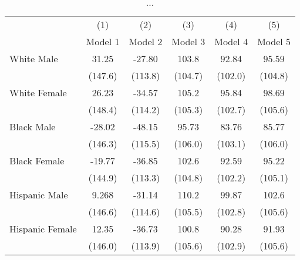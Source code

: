 \begin{table}[htbp]\centering
\def\sym#1{\ifmmode^{#1}\else\(^{#1}\)\fi}
\caption{...}
\begin{tabular}{l*{5}{c}}
\hline\hline
                    &\multicolumn{1}{c}{(1)}&\multicolumn{1}{c}{(2)}&\multicolumn{1}{c}{(3)}&\multicolumn{1}{c}{(4)}&\multicolumn{1}{c}{(5)}\\
                    &\multicolumn{1}{c}{Model 1}&\multicolumn{1}{c}{Model 2}&\multicolumn{1}{c}{Model 3}&\multicolumn{1}{c}{Model 4}&\multicolumn{1}{c}{Model 5}\\
\hline
White Male          &       31.25         &      -27.80         &       103.8         &       92.84         &       95.59         \\
                    &     (147.6)         &     (113.8)         &     (104.7)         &     (102.0)         &     (104.8)         \\
[1em]
White Female        &       26.23         &      -34.57         &       105.2         &       95.84         &       98.69         \\
                    &     (148.4)         &     (114.2)         &     (105.3)         &     (102.7)         &     (105.6)         \\
[1em]
Black Male          &      -28.02         &      -48.15         &       95.73         &       83.76         &       85.77         \\
                    &     (146.3)         &     (115.5)         &     (106.0)         &     (103.1)         &     (106.0)         \\
[1em]
Black Female        &      -19.77         &      -36.85         &       102.6         &       92.59         &       95.22         \\
                    &     (144.9)         &     (113.3)         &     (104.8)         &     (102.2)         &     (105.1)         \\
[1em]
Hispanic Male       &       9.268         &      -31.14         &       110.2         &       99.87         &       102.6         \\
                    &     (146.6)         &     (114.6)         &     (105.5)         &     (102.8)         &     (105.6)         \\
[1em]
Hispanic Female     &       12.35         &      -36.73         &       100.8         &       90.28         &       91.93         \\
                    &     (146.0)         &     (113.9)         &     (105.6)         &     (102.9)         &     (105.6)         \\

\end{tabular}
\end{table}
